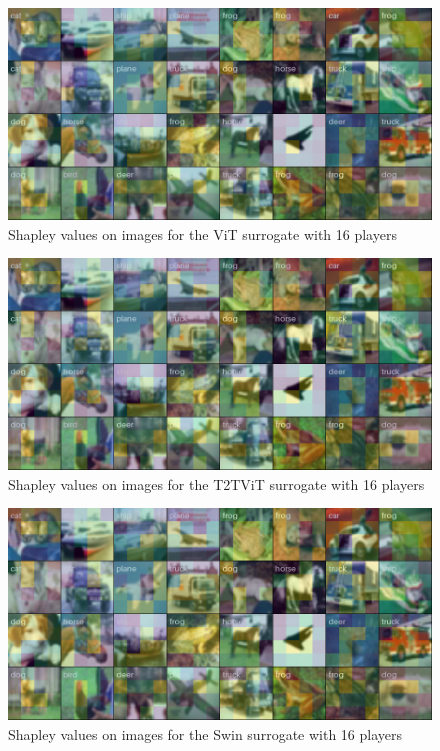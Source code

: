 \documentclass[magisterska,en]{pracamgr}
\begin{document}
\pagebreak

\begin{figure}[H]
\centering
\includegraphics[scale=0.4]{./images/vit_shap_grid.png}
\caption{Shapley values on images for the ViT surrogate with 16 players}
\label{vit_shap_grid}
\end{figure}


\begin{figure}[H]
\centering
\includegraphics[scale=0.4]{./images/t2t_vit_shap_grid.png}
\caption{Shapley values on images for the T2T\textunderscore{}ViT surrogate with 16 players}
\label{t2t_vit_shap_grid}
\end{figure}


\begin{figure}[H]
\centering
\includegraphics[scale=0.4]{./images/swin_shap_grid.png}
\caption{Shapley values on images for the Swin surrogate with 16 players}
\label{swin_shap_grid}
\end{figure}
\end{document}
